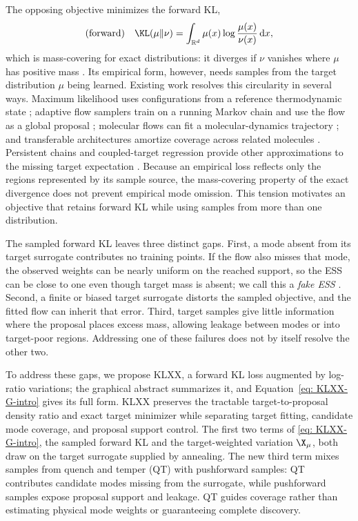 \documentclass{article}
\begin{document}
The opposing objective minimizes the forward KL,
\begin{equation}
    \text{(forward)}\quad \KL(\mu\|\nu) = \int_{\mathbb R^d} \mu(x) \log \frac{\mu(x)}{\nu(x)} \D x,
    \label{eq: forward KL}
\end{equation}
which is mass-covering for exact distributions: it diverges if $\nu$ vanishes where $\mu$ has positive mass \citep{wainwright2008graphical}. Its empirical form, however, needs samples from the target distribution $\mu$ being learned. Existing work resolves this circularity in several ways. Maximum likelihood uses configurations from a reference thermodynamic state \citep{wirnsberger2020targeted}; adaptive flow samplers train on a running Markov chain and use the flow as a global proposal \citep{gabrie2022adaptive}; molecular flows can fit a molecular-dynamics trajectory \citep{klein2023equivariant}; and transferable architectures amortize coverage across related molecules \citep{klein2024transferable}. Persistent chains and coupled-target regression provide other approximations to the missing target expectation \citep{naesseth2020markovian,rehman2026regflow}. Because an empirical loss reflects only the regions represented by its sample source, the mass-covering property of the exact divergence does not prevent empirical mode omission. This tension motivates an objective that retains forward KL while using samples from more than one distribution.

The sampled forward KL leaves three distinct gaps. First, a mode absent from its target surrogate contributes no training points. If the flow also misses that mode, the observed weights can be nearly uniform on the reached support, so the ESS can be close to one even though target mass is absent; we call this a \emph{fake ESS} \citep{noe2019boltzmann,midgley2022flow}. Second, a finite or biased target surrogate distorts the sampled objective, and the fitted flow can inherit that error. Third, target samples give little information where the proposal places excess mass, allowing leakage between modes or into target-poor regions. Addressing one of these failures does not by itself resolve the other two.

To address these gaps, we propose KLXX, a forward KL loss augmented by log-ratio variations; the graphical abstract summarizes it, and Equation~\eqref{eq: KLXX-G-intro} gives its full form. KLXX preserves the tractable target-to-proposal density ratio and exact target minimizer while separating target fitting, candidate mode coverage, and proposal support control. The first two terms of \eqref{eq: KLXX-G-intro}, the sampled forward KL and the target-weighted variation $\X_\mu$, both draw on the target surrogate supplied by annealing. The new third term mixes samples from quench and temper (QT) with pushforward samples: QT contributes candidate modes missing from the surrogate, while pushforward samples expose proposal support and leakage. QT guides coverage rather than estimating physical mode weights or guaranteeing complete discovery.
\end{document}

